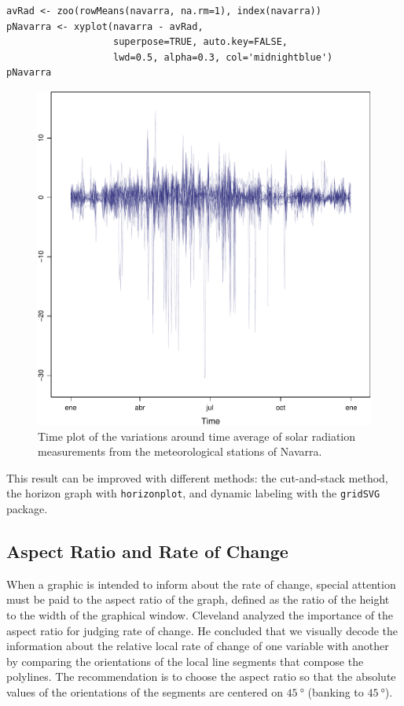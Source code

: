 \documentclass[smallroyalvopaper]{memoir}
\begin{document}

\lstset{language=R,numbers=none}
\begin{lstlisting}
avRad <- zoo(rowMeans(navarra, na.rm=1), index(navarra))
pNavarra <- xyplot(navarra - avRad,
                   superpose=TRUE, auto.key=FALSE,
                   lwd=0.5, alpha=0.3, col='midnightblue') 
pNavarra
\end{lstlisting}

\begin{figure}[htb]
\centering
\includegraphics[width=.9\linewidth]{figs/navarra.pdf}
\caption{\label{fig:navarraNaive}Time plot of the variations around time average of solar radiation measurements from the meteorological stations of Navarra.}
\end{figure}

This result can be improved with different methods: the cut-and-stack
method, the horizon graph with \texttt{horizonplot}, and dynamic labeling
with the \texttt{gridSVG} package.

\subsection{Aspect Ratio and Rate of Change}
\label{sec-2-1}
When a graphic is intended to inform about the rate of change,
special attention must be paid to the aspect ratio of the graph,
defined as the ratio of the height to the width of the graphical
window. Cleveland analyzed the importance of the aspect ratio for
judging rate of change. He concluded that we visually decode the
information about the relative local rate of change of one
variable with another by comparing the orientations of the local
line segments that compose the polylines. The recommendation is to
choose the aspect ratio so that the absolute values of the
orientations of the segments are centered on $\SI{45}{\degree}$ (banking
to $\SI{45}{\degree}$). 
\end{document}
